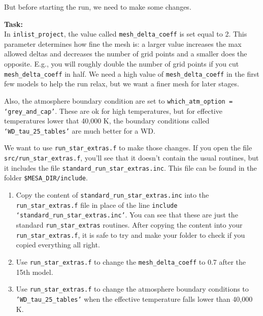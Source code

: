 \documentclass{article}
\begin{document}
But before starting the run, we need to make some changes.

\textbf{Task:} \\ 
In \texttt{inlist\_project}, the value called \texttt{mesh\_delta\_coeff} is set equal to 2. This parameter determines how fine the mesh is: a larger value increases the max allowed deltas and decreases the number of grid points and a smaller does the opposite. E.g., you will roughly double the number of grid points if you cut \texttt{mesh\_delta\_coeff} in half. We need a high value of \texttt{mesh\_delta\_coeff} in the first few models to help the run relax, but we want a finer mesh for later stages.

Also, the atmosphere boundary condition are set to \texttt{which\_atm\_option = `grey\_and\_cap'}. These are ok for high temperatures, but for effective temperatures lower that 40,000 K, the boundary conditions called \texttt{`WD\_tau\_25\_tables'} are much better for a WD.

We want to use \texttt{run\_star\_extras.f} to make those changes. If you open the file \texttt{src/run\_star\_extras.f}, you'll see that it doesn't contain the usual routines, but it includes the file \texttt{standard\_run\_star\_extras.inc}. This file can be found in the folder \texttt{\$MESA\_DIR/include}.

\begin{enumerate}
    \item Copy the content of \texttt{standard\_run\_star\_extras.inc} into the \texttt{run\_star\_extras.f} file in place of the line \texttt{include `standard\_run\_star\_extras.inc'}. You can see that these are just the standard \texttt{run\_star\_extras} routines. After copying the content into your \texttt{run\_star\_extras.f}, it is safe to try and make your folder to check if you copied everything all right.
    \item Use \texttt{run\_star\_extras.f} to change the \texttt{mesh\_delta\_coeff} to 0.7 after the 15th model.
    \item Use \texttt{run\_star\_extras.f} to change the atmosphere boundary conditions to \texttt{'WD\_tau\_25\_tables'} when the effective temperature falls lower than 40,000 K.
\end{enumerate}

\end{document}
